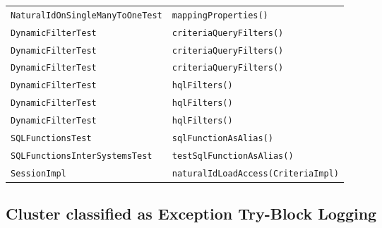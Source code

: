 \begin{center}
\begin{longtable}{ll}
\lstinline/NaturalIdOnSingleManyToOneTest/&{\lstinline/mappingProperties()/}\\
\lstinline/DynamicFilterTest/&{\lstinline/criteriaQueryFilters()/}\\
\lstinline/DynamicFilterTest/&{\lstinline/criteriaQueryFilters()/}\\
\lstinline/DynamicFilterTest/&{\lstinline/criteriaQueryFilters()/}\\
\lstinline/DynamicFilterTest/&{\lstinline/hqlFilters()/}\\
\lstinline/DynamicFilterTest/&{\lstinline/hqlFilters()/}\\
\lstinline/DynamicFilterTest/&{\lstinline/hqlFilters()/}\\
\lstinline/SQLFunctionsTest/&{\lstinline/sqlFunctionAsAlias()/}\\
\lstinline/SQLFunctionsInterSystemsTest/&{\lstinline/testSqlFunctionAsAlias()/}\\
\lstinline/SessionImpl/&{\lstinline/naturalIdLoadAccess(CriteriaImpl)/}\\
\end{longtable}
\end{center}



\subsection{Cluster classified as Exception Try-Block Logging}

